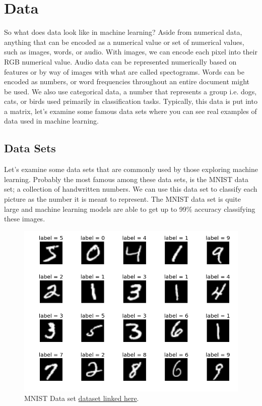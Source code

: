 \documentclass{article}
\begin{document}
\newpage
\section{Data}
So what does data look like in machine learning? 
Aside from numerical data, anything that can be encoded as a numerical value or set of numerical values, such as images, words, or audio. 
With images, we can encode each pixel into their RGB numerical value. 
Audio data can be represented numerically based on features or by way of images with what are called spectograms. 
Words can be encoded as numbers, or word frequencies throughout an entire document might be used. 
We also use categorical data, a number that represents a group i.e. dogs, cats, or birds used primarily in classification tasks. 
Typically, this data is put into a matrix, let's examine some famous data sets where you can see real examples of data used in machine learning.

\subsection{Data Sets}
Let's examine some data sets that are commonly used by those exploring machine learning. Probably the most famous among these data sets, is the MNIST data set; a collection of handwritten numbers. We can use this data set to classify each picture as the number it is meant to represent. The MNIST data set is quite large and machine learning models are able to get up to 99\% accuracy classifying these images.

\begin{figure}[H]
    \centering
    \includegraphics[width=4.5in]{mnist.png}
    \caption{MNIST Data set \href{http://yann.lecun.com/exdb/mnist/}{dataset linked here}.}
    \label{fig:mnist}
\end{figure}
\end{document}
